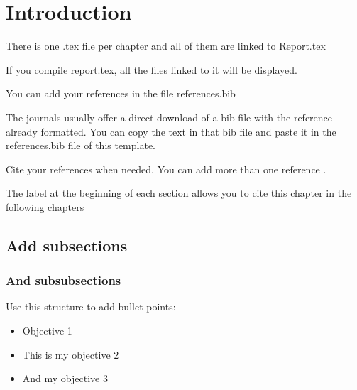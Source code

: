 \section{Introduction}
\label{sec:introduction} 



\vspace{0.1 in}
\noindent

There is one .tex file per chapter and all of them are linked to Report.tex


\vspace{0.1 in}
\noindent
If you compile report.tex, all the files linked to it will be displayed.

\vspace{0.1 in}
\noindent
You can add your references in the file references.bib

\vspace{0.1 in}
\noindent
The journals usually offer a direct download of a bib file with the reference already formatted. You can copy the text in that bib file and paste it in the references.bib file of this template.

\vspace{0.1 in}
\noindent
Cite your references \cite{UKGovernment} when needed. You can add more than one reference \cite{ZHENG201855, ZHENG201855, Das2010RecyclingVehicles}.

\vspace{0.1 in}
\noindent
The label at the beginning of each section allows you to cite this chapter in the following chapters


\vspace{0.1 in}
\noindent

\subsection{\textbf{Add subsections}}

\vspace{0.1 in}
\noindent

\subsubsection{\textbf{And subsubsections}}


\vspace{0.1 in}
\noindent

Use this structure to add bullet points:

\begin{itemize}

\item Objective 1

\item This is my objective 2

\item And my objective 3

\end{itemize}




